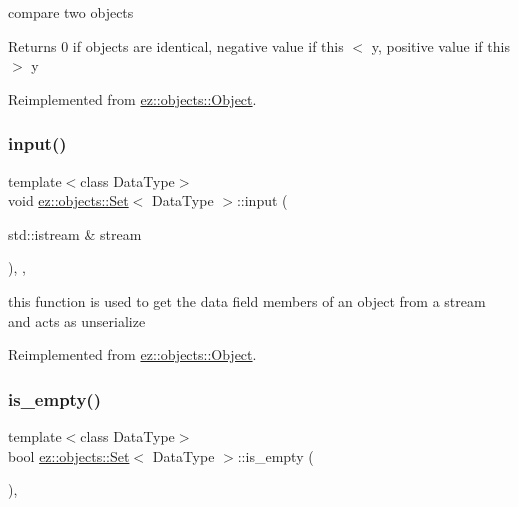 compare two objects \begin{DoxyReturn}{Returns}
0 if objects are identical, negative value if this $<$ y, positive value if this $>$ y 
\end{DoxyReturn}


Reimplemented from \hyperlink{classez_1_1objects_1_1Object_aca311d389dffa204e425463145f4e1e6}{ez\+::objects\+::\+Object}.

\mbox{\label{classez_1_1objects_1_1Set_a338e14cc6fe1afa7031a6f5f4959acf1}} 
\subsubsection{\texorpdfstring{input()}{input()}}
{\footnotesize\ttfamily template$<$class Data\+Type$>$ \\
void \hyperlink{classez_1_1objects_1_1Set}{ez\+::objects\+::\+Set}$<$ Data\+Type $>$\+::input (\begin{DoxyParamCaption}\item[{std\+::istream \&}]{stream }\end{DoxyParamCaption})\hspace{0.3cm}{\ttfamily [inline]}, {\ttfamily [override]}, {\ttfamily [virtual]}}

this function is used to get the data field members of an object from a stream and acts as unserialize 

Reimplemented from \hyperlink{classez_1_1objects_1_1Object_a878bdc53b7f16fda6fa15dab214c4b6a}{ez\+::objects\+::\+Object}.

\mbox{\label{classez_1_1objects_1_1Set_a0b65ed5aee3fa32d0ddcb5a4a89f4dc3}} 
\subsubsection{\texorpdfstring{is\+\_\+empty()}{is\_empty()}}
{\footnotesize\ttfamily template$<$class Data\+Type$>$ \\
bool \hyperlink{classez_1_1objects_1_1Set}{ez\+::objects\+::\+Set}$<$ Data\+Type $>$\+::is\+\_\+empty (\begin{DoxyParamCaption}{ }\end{DoxyParamCaption})\hspace{0.3cm}{\ttfamily [inline]}, {\ttfamily [virtual]}}

